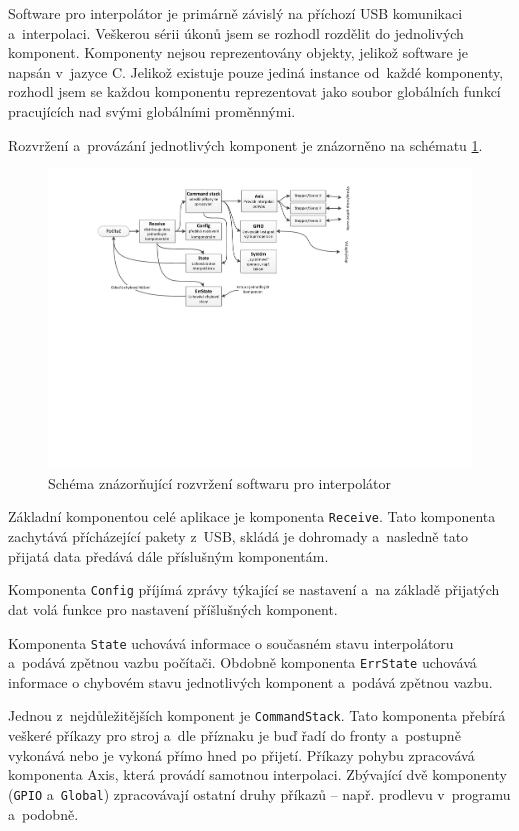 	Software pro interpolátor je primárně závislý na příchozí USB komunikaci a~interpolaci. Veškerou sérii úkonů jsem se rozhodl rozdělit do jednolivých komponent. Komponenty nejsou reprezentovány objekty, jelikož software je napsán v~jazyce C. Jelikož existuje pouze jediná instance od~každé komponenty, rozhodl jsem se každou komponentu reprezentovat jako soubor globálních funkcí pracujících nad svými globálními proměnnými.
	
	Rozvržení a~provázání jednotlivých komponent je znázorněno na schématu \ref{nak:rozvrzeni}.
	
	\begin{figure}[h]
		\centering
		\includegraphics[width=1\textwidth]{img/rozvrzeni2.pdf}
		\caption{Schéma znázorňující rozvržení softwaru pro interpolátor}\label{nak:rozvrzeni}	
	\end{figure}
	
	Základní komponentou celé aplikace je komponenta {\tt Receive}. Tato komponenta zachytává přícházející pakety z~USB, skládá je dohromady a~nasledně tato přijatá data předává dále příslušným komponentám.
	
	Komponenta {\tt Config} příjímá zprávy týkající se nastavení a~na základě přijatých dat volá funkce pro nastavení příšlušných komponent.
	
	Komponenta {\tt State} uchovává informace o současném stavu interpolátoru a~podává zpětnou vazbu počítači. Obdobně komponenta {\tt ErrState} uchovává informace o chybovém stavu jednotlivých komponent a~podává zpětnou vazbu.
	
	Jednou z~nejdůležitějších komponent je {\tt CommandStack}. Tato komponenta přebírá veškeré příkazy pro stroj a~dle příznaku je buď řadí do fronty a~postupně vykonává nebo je vykoná přímo hned po přijetí. Příkazy pohybu zpracovává komponenta Axis, která provádí samotnou interpolaci. Zbývající dvě komponenty ({\tt GPIO} a~{\tt Global}) zpracovávají ostatní druhy příkazů -- např. prodlevu v~programu a~podobně.
	
